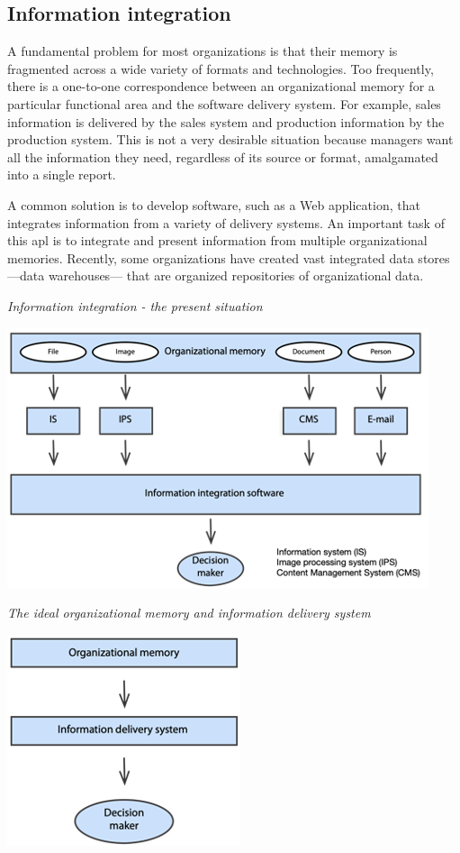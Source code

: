 \documentclass[
]{article}
\begin{document}
\hypertarget{information-integration}{%
\subsection*{Information integration}\label{information-integration}}

A fundamental problem for most organizations is that their memory is
fragmented across a wide variety of formats and technologies. Too
frequently, there is a one-to-one correspondence between an
organizational memory for a particular functional area and the software
delivery system. For example, sales information is delivered by the
sales system and production information by the production system. This
is not a very desirable situation because managers want all the
information they need, regardless of its source or format, amalgamated
into a single report.

A common solution is to develop software, such as a Web application,
that integrates information from a variety of delivery systems. An
important task of this apl is to integrate and present information from
multiple organizational memories. Recently, some organizations have
created vast integrated data stores---data warehouses--- that are
organized repositories of organizational data.

\emph{Information integration - the present situation}

\includegraphics{Figures/Chapter 2/fragmented memory.png}

\emph{The ideal organizational memory and information delivery system}

\includegraphics{Figures/Chapter 2/integrated memory.png}
\end{document}
